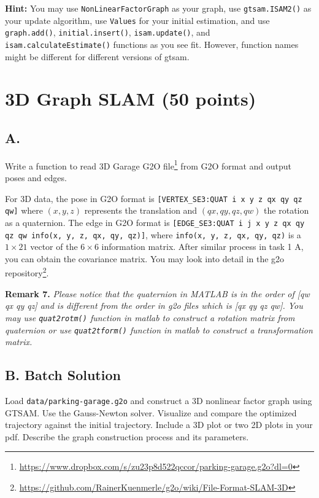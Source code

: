 \documentclass[tp]{lcc}
\begin{document}
\textbf{Hint:} You may use \lstinline[style=bash]{NonLinearFactorGraph} as your graph, use \lstinline[style=bash]{gtsam.ISAM2()} as your update algorithm, use \lstinline[style=bash]{Values} for your initial estimation, and use \lstinline[style=bash]{graph.add()}, \lstinline[style=bash]{initial.insert()}, \lstinline[style=bash]{isam.update()}, and \lstinline[style=bash]{isam.calculateEstimate()} functions as you see fit. However, function names might be different for different versions of gtsam.

\section{3D Graph SLAM (50 points)}
\subsection{A.}
Write a function to read 3D Garage G2O file\footnote{\url{https://www.dropbox.com/s/zu23p8d522qccor/parking-garage.g2o?dl=0}} from G2O format and output poses and edges.

For 3D data, the pose in G2O format is \lstinline[style=bash]{[VERTEX_SE3:QUAT i x y z qx qy qz qw]} where $(x,y,z)$ represents the translation and $(qx,qy,qz,qw)$ the rotation as a quaternion. The edge in G2O format is \lstinline[style=bash]{[EDGE_SE3:QUAT i j x y z qx qy qz qw info(x, y, z, qx, qy, qz)]}, where \lstinline[style=bash]{info(x, y, z, qx, qy, qz)} is a $1 \times 21$ vector of the $6 \times 6$ information matrix. After similar process in task 1 A, you can obtain the covariance matrix. You may look into detail in the g2o repository\footnote{\url{https://github.com/RainerKuenmerle/g2o/wiki/File-Format-SLAM-3D}}.

\textbf{Remark 7.} \textit{Please notice that the quaternion in MATLAB is in the order of [qw qx qy qz] and is different from the order in g2o files which is [qx qy qz qw]. You may use \lstinline[style=bash]{quat2rotm()} function in matlab to construct a rotation matrix from quaternion or use \lstinline[style=bash]{quat2tform()} function in matlab to construct a transformation matrix.}

\subsection{B. Batch Solution}
Load \lstinline[style=bash]{data/parking-garage.g2o} and construct a 3D nonlinear factor graph using GTSAM. Use the Gauss-Newton solver. Visualize and compare the optimized trajectory against the initial trajectory. Include a 3D plot or two 2D plots in your pdf. Describe the graph construction process and its parameters.
\end{document}
